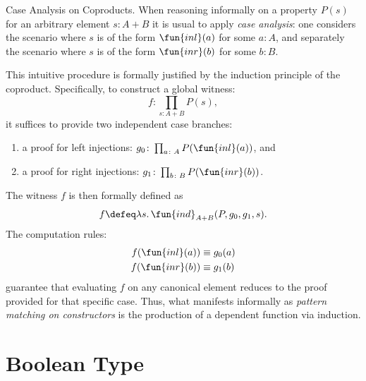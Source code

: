 \begin{lpar}{Case Analysis on Coproducts.}
    When reasoning informally on a property $P(s)$ for an arbitrary element $s\colon A+B$ it is usual to apply \textit{case analysis\/}: one considers the scenario where $s$ is of the form $\fun{inl}(a)$ for some $a\colon A$, and separately the scenario where $s$ is of the form $\fun{inr}(b)$ for some $b\colon B$.
    
    This intuitive procedure is formally justified by the induction principle of the coproduct. Specifically, to construct a global witness:
    \[
        f\colon\prod_{s\colon A+B}P(s),
    \]
    it suffices to provide two independent case branches:
    \begin{enumerate}[-]
        \item a proof for left injections: $g_0\colon\prod_{a\colon A}P(\fun{inl}(a))$, and

        \item a proof for right injections: $g_1\colon\prod_{b\colon B}P(\fun{inr}(b))$.
    \end{enumerate}
    The witness $f$ is then formally defined as
    \[
        f\defeq\lambda s.\,\fun{ind}_{A+B}(P,g_0,g_1,s).
    \]
    The computation rules:
    \begin{align*}
        f(\fun{inl}(a))&\equiv g_0(a)\\
        f(\fun{inr}(b))&\equiv g_1(b)
    \end{align*}
    guarantee that evaluating $f$ on any canonical element reduces to the proof provided for that specific case. Thus, what manifests informally as \textit{pattern matching on constructors\/} is the production of a dependent function via induction.
\end{lpar}


\section{Boolean Type}

